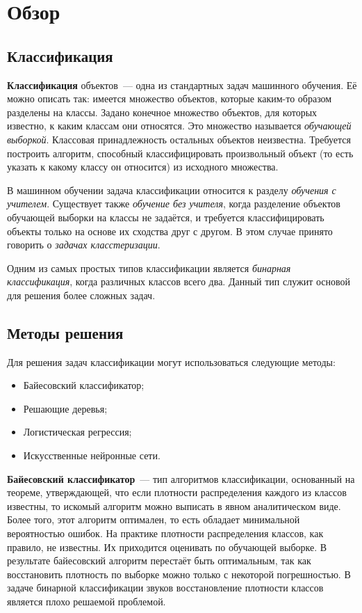 \section{Обзор}
\subsection{Классификация}
	\textbf{Классификация} объектов~--- одна из стандартных задач машинного обучения.
	Её можно описать так: имеется множество объектов, которые каким-то образом разделены на классы.
	Задано конечное множество объектов, для которых известно, к каким классам они относятся.
	Это множество называется \textit{обучающей выборкой}. Классовая принадлежность остальных объектов неизвестна.
	Требуется построить алгоритм, способный классифицировать произвольный объект (то есть указать к какому классу он относится) из исходного множества.

	В машинном обучении задача классификации относится к разделу \textit{обучения с учителем}. Существует также \textit{обучение без учителя},
	когда разделение объектов обучающей выборки на классы не задаётся, и требуется классифицировать объекты только на основе их
	сходства друг с другом. В этом случае принято говорить о \textit{задачах класстеризации}.

	Одним из самых простых типов классификации является \textit{бинарная классификация}, когда различных классов всего два.
	Данный тип служит основой для решения более сложных задач.

\subsection{Методы решения}
	Для решения задач классификации могут использоваться следующие методы:
	\begin{itemize}
		\item Байесовский классификатор;
		\item Решающие деревья;
		\item Логистическая регрессия;
		\item Искусственные нейронные сети.
	\end{itemize}

	\textbf{Байесовский классификатор}~--- тип алгоритмов классификации, основанный  на теореме, утверждающей,
	что если плотности распределения каждого из классов известны, то искомый алгоритм можно выписать в явном аналитическом виде.
	Более того, этот алгоритм оптимален, то есть обладает минимальной вероятностью ошибок.
	На практике плотности распределения классов, как правило, не известны. Их приходится оценивать по обучающей выборке.
	В результате байесовский алгоритм перестаёт быть оптимальным, так как восстановить плотность по выборке можно только с некоторой погрешностью.
	В задаче бинарной классификации звуков восстановление плотности классов является плохо решаемой проблемой.

